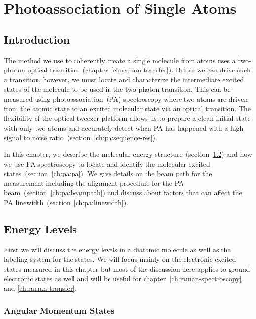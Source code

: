 
\chapter{Photoassociation of Single Atoms}
\label{ch:pa}

\section{Introduction}

The method we use to coherently create a single molecule from atoms
uses a two-photon optical transition~(chapter~\ref{ch:raman-transfer}).
Before we can drive such a transition, however, we must locate and characterize
the intermediate excited states of the molecule to be used in the two-photon transition.
This can be measured using photoassociation~(PA) spectroscopy
where two atoms are driven from the atomic state to an excited molecular state
via an optical transition.
The flexibility of the optical tweezer platform allows us to
prepare a clean initial state with only two atoms
and accurately detect when PA has happened
with a high signal to noise ratio~(section~\ref{ch:pa:sequence-res}).

In this chapter, we describe the molecular energy structure~(section~\ref{ch:pa:structure})
and how we use PA spectroscopy to locate and
identify the molecular excited states~(section~\ref{ch:pa:pa}).
We give details on the beam path for the measurement including
the alignment procedure for the PA beam~(section~\ref{ch:pa:beampath})
and discuss about factors that can affect
the PA linewidth~(section~\ref{ch:pa:linewidth}).

\section{Energy Levels}
\label{ch:pa:structure}

First we will discuss the energy levels in a diatomic molecule
as well as the labeling system for the states.
We will focus mainly on the electronic excited states measured in this chapter
but most of the discussion here applies to ground electronic states as well
and will be useful for chapter~\ref{ch:raman-spectroscopy} and \ref{ch:raman-transfer}.

\subsection{Angular Momentum States}

